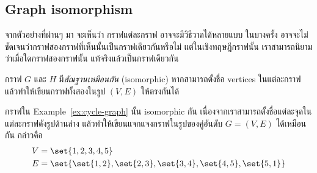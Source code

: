 \subsection{Graph isomorphism}

จากตัวอย่างที่ผ่านๆ มา จะเห็นว่า กราฟแต่ละกราฟ อาจจะมีวิธีวาดได้หลายแบบ \enskip ในบางครั้ง อาจจะไม่ชัดเจนว่ากราฟสองกราฟที่เห็นนั้นเป็นกราฟเดียวกันหรือไม่ แต่ในเชิงทฤษฎีกราฟนั้น เราสามารถนิยามว่าเมื่อใดกราฟสองกราฟนั้น แท้จริงแล้วเป็นกราฟเดียวกัน

\begin{definition}
กราฟ $G$ และ $H$ มี\emph{สัณฐานเหมือนกัน} (isomorphic) หากสามารถตั้งชื่อ vertices ในแต่ละกราฟ แล้วทำให้เขียนกราฟทั้งสองในรูป $(V,E)$ ให้ตรงกันได้
\end{definition}
%
\begin{example}
กราฟใน Example~\ref{ex:cycle-graph} นั้น isomorphic กัน เนื่องจากเราสามารถตั้งชื่อแต่ละจุดในแต่ละกราฟดังรูปด้านล่าง แล้วทำให้เขียนแจกแจงกราฟในรูปของคู่อันดับ $G=(V,E)$ ได้เหมือนกัน กล่าวคือ
\begin{align*}
    V &= \set{1,2,3,4,5} \\
    E &= \set{\set{1,2},\set{2,3},\set{3,4},\set{4,5},\set{5,1}}
\end{align*}
\begin{center}
\begin{multicols}{2}

\end{multicols}
\end{center}
\end{example}

